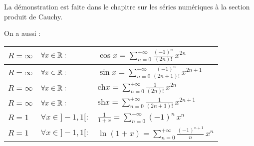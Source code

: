 \documentclass{book}
\begin{document}
\begin{Demonstration}
La démonstration est faite dans le chapitre sur les séries numériques à la section produit de Cauchy.
\end{Demonstration}
On a aussi :\\
\begin{tabular}{l|ll}
$R=\infty$ & $\forall x \in\mathbb{R}:$& $\cos x  = \sum\limits_{n=0}^{+\infty} \frac{(-1)^n}{(2n)!} \, x^{2n}$\\ \hline
$R=\infty$ & $\forall x \in\mathbb{R}:$&$\sin x  =  \sum\limits_{n=0}^{+\infty} \frac{(-1)^n}{(2n+1)!} \, x^{2n+1}$\\ \hline
$R=\infty$ & $\forall x \in\mathbb{R}: $&$\text{ch} x =  \sum\limits_{n=0}^{+\infty} \frac{1}{(2n)!} \, x^{2n}$\\ \hline
$R=\infty$ & $\forall x \in\mathbb{R}:$&$ \text{sh} x =  \sum\limits_{n=0}^{+\infty} \frac{1}{(2n+1)!} \, x^{2n+1}$\\ \hline
$R=1$ & $\forall x \in]-1,1[:$&$ \frac{1}{1+x} = \sum\limits_{n=0}^{+\infty} (-1)^n \, x^{n}$\\ \hline
$R=1$ & $\forall x \in]-1,1[:$&$ \ln(1+x) =  \sum\limits_{n=0}^{+\infty} \frac{(-1)^{n+1}}{n} \, x^{n}$
\end{tabular}
\end{document}
